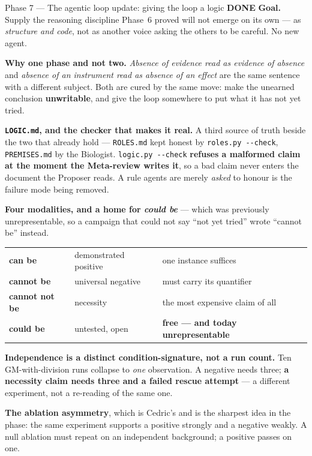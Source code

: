 \documentclass[11pt,a4paper]{article}
\newcommand{\code}[1]{\texttt{#1}}
\newcommand{\done}{\textcolor{good}{\textbf{DONE}}}
\begin{document}
\begin{phasebox}{Phase 7 --- The agentic loop update: giving the loop a logic \hfill \done}
\textbf{Goal.} Supply the reasoning discipline Phase~6 proved will not emerge on its own --- as
\emph{structure and code}, not as another voice asking the others to be careful. No new agent.

\textbf{Why one phase and not two.} \emph{Absence of evidence read as evidence of absence} and
\emph{absence of an instrument read as absence of an effect} are the same sentence with a different
subject. Both are cured by the same move: make the unearned conclusion \textbf{unwritable}, and
give the loop somewhere to put what it has not yet tried.

\textbf{\code{LOGIC.md}, and the checker that makes it real.} A third source of truth beside the
two that already hold --- \code{ROLES.md} kept honest by \code{roles.py -{}-check},
\code{PREMISES.md} by the Biologist. \code{logic.py -{}-check} \textbf{refuses a malformed claim at
the moment the Meta-review writes it}, so a bad claim never enters the document the Proposer reads.
A rule agents are merely \emph{asked} to honour is the failure mode being removed.

\textbf{Four modalities, and a home for \emph{could be}} --- which was previously unrepresentable,
so a campaign that could not say ``not yet tried'' wrote ``cannot be'' instead.

\begin{center}
\begin{tabular}{@{}llp{6.2cm}@{}}
\textbf{can be} & demonstrated positive & one instance suffices \\
\textbf{cannot be} & universal negative & must carry its quantifier \\
\textbf{cannot not be} & necessity & the most expensive claim of all \\
\textbf{could be} & untested, open & \textbf{free --- and today unrepresentable} \\
\end{tabular}
\end{center}

\textbf{Independence is a distinct condition-signature, not a run count.} Ten GM-with-division runs
collapse to \emph{one} observation. A negative needs three; \textbf{a necessity claim needs three
and a failed rescue attempt} --- a different experiment, not a re-reading of the same one.

\textbf{The ablation asymmetry}, which is Cedric's and is the sharpest idea in the phase: the same
experiment supports a positive strongly and a negative weakly. A null ablation must repeat on an
independent background; a positive passes on one.


\end{phasebox}
\end{document}

